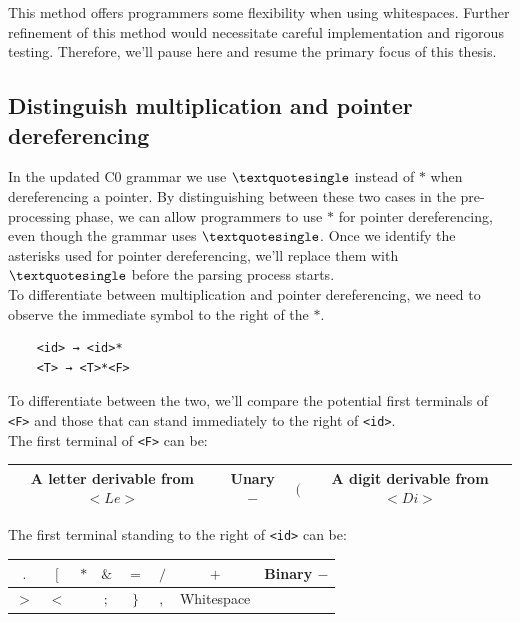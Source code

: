 This method offers programmers some flexibility when using whitespaces. Further refinement of this method would necessitate careful implementation and rigorous testing. Therefore, we'll pause here and resume the primary focus of this thesis.

\vspace{30pt}

\subsection{Distinguish multiplication and pointer dereferencing}

In the updated C0 grammar we use \(\textquotesingle\) instead of \(\ast\) when dereferencing a pointer. By distinguishing between these two cases in the pre-processing phase, we can allow programmers to use \(\ast\) for pointer dereferencing, even though the grammar uses \(\textquotesingle\). Once we identify the asterisks used for pointer dereferencing, we'll replace them with \(\textquotesingle\) before the parsing process starts.\\

To differentiate between multiplication and pointer dereferencing, we need to observe the immediate symbol to the right of the \(\ast\).

\begin{verbatim}
    <id> → <id>*
    <T> → <T>*<F>
\end{verbatim}

To differentiate between the two, we'll compare the potential first terminals of \texttt{<F>} and those that can stand immediately to the right of \texttt{<id>}.\\

The first terminal of \texttt{<F>} can be:
\begin{center}
    \begin{tabular}{|c|c|c|c|}
        \hline
        A letter derivable from \( <Le> \) & Unary \( - \) & \( ( \) & A digit derivable from \( <Di> \) \\
        \hline
    \end{tabular}
\end{center}

The first terminal standing to the right of \texttt{<id>} can be:
\begin{center}
    \begin{tabular}{|c|c|c|c|c|c|c|c|}
        \hline
        \( . \) & \( [ \) & \( \ast \) & \( \& \) & \( = \) & \( / \) & \( + \) & Binary \( - \)\\
        \hline
        \( > \) & \( < \) & \( \! \) & \( ; \) & \( \} \) & \( , \) & Whitespace & \\
        \hline
    \end{tabular}
\end{center}

